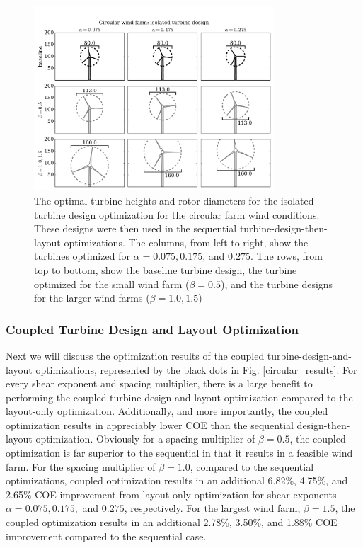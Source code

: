 \begin{figure}[htbp]
  \centering
  \includegraphics[width=0.8\textwidth]{Figures/turbineSizesCircular_sequential.pdf}
  \caption{\label{circular_turbines_seq} The optimal turbine heights and rotor diameters for the isolated turbine design optimization for the circular farm wind conditions. These designs were then used in the sequential turbine-design-then-layout optimizations. The columns, from left to right, show the turbines optimized for $\alpha=0.075,0.175$, and $0.275$. The rows, from top to bottom, show the baseline turbine design, the turbine optimized for the small wind farm ($\beta=0.5$), and the turbine designs for the larger wind farms ($\beta=1.0,1.5$)}
\end{figure}


\subsubsection{Coupled Turbine Design and Layout Optimization}
Next we will discuss the optimization results of the coupled turbine-design-and-layout optimizations, represented by the black dots in Fig. \ref{circular_results}. For every shear exponent and spacing multiplier, there is a large benefit to performing the coupled turbine-design-and-layout optimization compared to the layout-only optimization. Additionally, and more importantly, the coupled optimization results in appreciably lower COE than the sequential design-then-layout optimization. Obviously for a spacing multiplier of $\beta=0.5$, the coupled optimization is far superior to the sequential in that it results in a feasible wind farm. For the spacing multiplier of $\beta=1.0$, 
compared to the sequential optimizations, coupled optimization results in an additional 6.82\%, 4.75\%, and 2.65\% COE improvement from layout only optimization for shear exponents $\alpha=0.075, 0.175,$ and $0.275$, respectively. For the largest wind farm, $\beta=1.5$, the coupled optimization results in an additional 2.78\%, 3.50\%, and 1.88\% COE improvement compared to the sequential case. 

